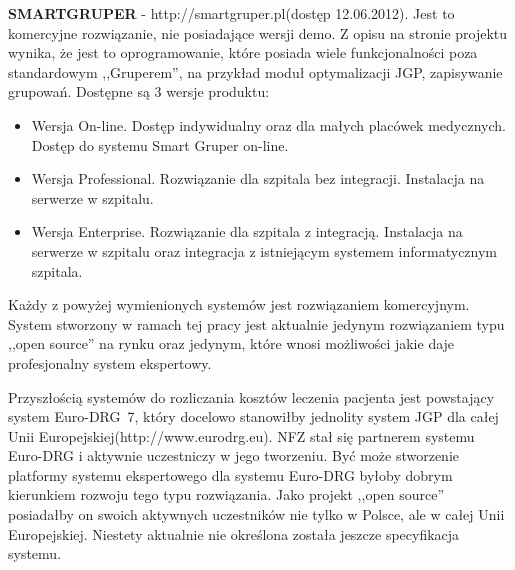 \textbf{SMARTGRUPER} - http://smartgruper.pl(dostęp 12.06.2012). Jest to komercyjne rozwiązanie, nie posiadające wersji demo. Z opisu na stronie projektu wynika, że jest to oprogramowanie, które posiada wiele funkcjonalności poza standardowym ,,Gruperem'', na przykład moduł optymalizacji JGP, zapisywanie grupowań. Dostępne są 3 wersje produktu:
\begin{itemize}
 \item Wersja On-line. Dostęp indywidualny oraz dla małych placówek medycznych. Dostęp do systemu Smart Gruper on-line.
 \item Wersja Professional. Rozwiązanie dla szpitala bez integracji. Instalacja na serwerze w szpitalu.
 \item Wersja Enterprise. Rozwiązanie dla szpitala z integracją. Instalacja na serwerze w szpitalu oraz integracja z istniejącym systemem informatycznym szpitala.
\end{itemize}

Każdy z powyżej wymienionych systemów jest rozwiązaniem komercyjnym. System stworzony w ramach tej pracy jest aktualnie jedynym rozwiązaniem typu ,,open source'' na rynku oraz jedynym, które wnosi możliwości jakie daje profesjonalny system ekspertowy.

Przyszłością systemów do rozliczania kosztów leczenia pacjenta jest powstający system \mbox{Euro-DRG~7}, który docelowo stanowiłby jednolity system JGP dla całej Unii Europejskiej(http://www.eurodrg.eu).
NFZ stał się partnerem systemu Euro-DRG i aktywnie uczestniczy w jego tworzeniu. Być może stworzenie platformy systemu ekspertowego dla systemu Euro-DRG byłoby dobrym kierunkiem rozwoju tego typu rozwiązania. Jako projekt ,,open source'' posiadałby on swoich aktywnych uczestników nie tylko w Polsce, ale w całej Unii Europejskiej. Niestety aktualnie nie określona została jeszcze specyfikacja systemu. 

